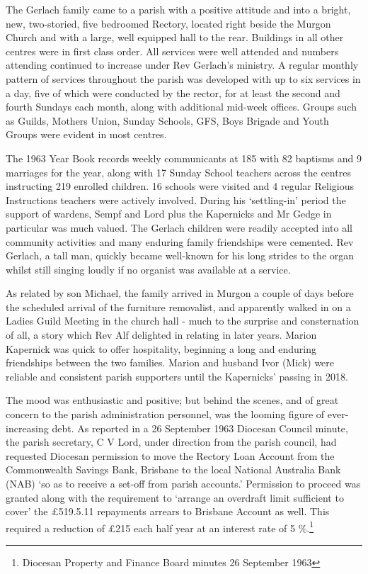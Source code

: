 The Gerlach family came to a parish with a positive attitude and into a
bright, new, two-storied, five bedroomed Rectory, located right beside
the Murgon Church and with a large, well equipped hall to the rear.
Buildings in all other centres were in first class order. All services
were well attended and numbers attending continued to increase under Rev
Gerlach's ministry. A regular monthly pattern of services throughout the
parish was developed with up to six services in a day, five of which
were conducted by the rector, for at least the second and fourth Sundays
each month, along with additional mid-week offices. Groups such as
Guilds, Mothers Union, Sunday Schools, GFS, Boys Brigade and Youth
Groups were evident in most centres.

The 1963 Year Book records weekly communicants at 185 with 82 baptisms
and 9 marriages for the year, along with 17 Sunday School teachers
across the centres instructing 219 enrolled children. 16 schools were
visited and 4 regular Religious Instructions teachers were actively
involved. During his `settling-in' period the support of wardens, Sempf
and Lord plus the Kapernicks and Mr Gedge in particular was much valued.
The Gerlach children were readily accepted into all community activities
and many enduring family friendships were cemented. Rev Gerlach, a tall
man, quickly became well-known for his long strides to the organ whilst
still singing loudly if no organist was available at a service.

As related by son Michael, the family arrived in Murgon a couple of days
before the scheduled arrival of the furniture removalist, and apparently
walked in on a Ladies Guild Meeting in the church hall - much to the
surprise and consternation of all, a story which Rev Alf delighted in
relating in later years. Marion Kapernick was quick to offer
hospitality, beginning a long and enduring friendships between the two
families. Marion and husband Ivor (Mick) were reliable and consistent
parish supporters until the Kapernicks' passing in 2018.

The mood was enthusiastic and positive; but behind the scenes, and of
great concern to the parish administration personnel, was the looming
figure of ever-increasing debt. As reported in a 26 September 1963
Diocesan Council minute, the parish secretary, C V Lord, under direction
from the parish council, had requested Diocesan permission to move the
Rectory Loan Account from the Commonwealth Savings Bank, Brisbane to the
local National Australia Bank (NAB) `so as to receive a set-off from
parish accounts.' Permission to proceed was granted along with the
requirement to `arrange an overdraft limit sufficient to cover' the
\pounds519.5.11 repayments arrears to Brisbane Account as well. This required
a reduction of \pounds215 each half year at an interest rate of 5 
\%.\footnote{Diocesan Property and Finance Board minutes 26 September
  1963}

